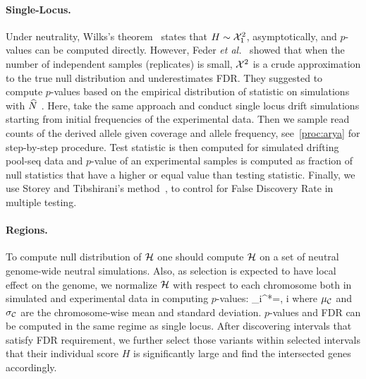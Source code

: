 \paragraph{Single-Locus.}
Under neutrality, Wilks’s theorem~\cite{williams2001weighing} states that 
$H\sim{\cal X}^2_1$, asymptotically, and $p$-values can be computed directly.
However, Feder \emph{et
	al.}~\cite{feder2014Identifying} showed that when the
number of independent samples (replicates) is small, ${\cal X}^2$ is a crude 
approximation to the true null distribution and underestimates FDR. They 
suggested to compute $p$-values based on the empirical
distribution of statistic on simulations with $\widehat{N}$ . Here, take the same 
approach and conduct single 
locus drift simulations starting from 
initial frequencies of the experimental data. Then we sample read counts of the 
derived allele given coverage and allele frequency, see~\ref{proc:arya} for 
step-by-step procedure. 
Test 
statistic is then computed for simulated drifting pool-seq data and $p$-value 
of an 
experimental samples is computed as fraction of null statistics that have a 
higher or equal value than testing statistic.
Finally, we use Storey and 
Tibshirani's method~\cite{storey2003statistical}, to control for False 
Discovery 
Rate in multiple testing.


\paragraph{Regions.}
To compute null distribution of ${\cal H}$ one should compute ${\cal H}$ on a set of 
neutral genome-wide neutral simulations. Also, as selection is expected to have 
local effect on the genome, we normalize ${\cal H}$ with respect to each chromosome 
both in simulated and experimental data in computing $p$-values:
\beq
\Hc_i^*=, \hspace{0.5in} \forall i \in 
  \Cc
\eeq
where $\mu_{\cal C}$ and $\sigma_{\cal C}$ are the chromosome-wise mean and standard 
deviation. $p$-values and FDR can be computed in the same regime as single 
locus. 
After discovering intervals that satisfy FDR requirement, we further select 
those variants within selected intervals that their individual score $H$ is 
significantly large and find the intersected genes accordingly.

